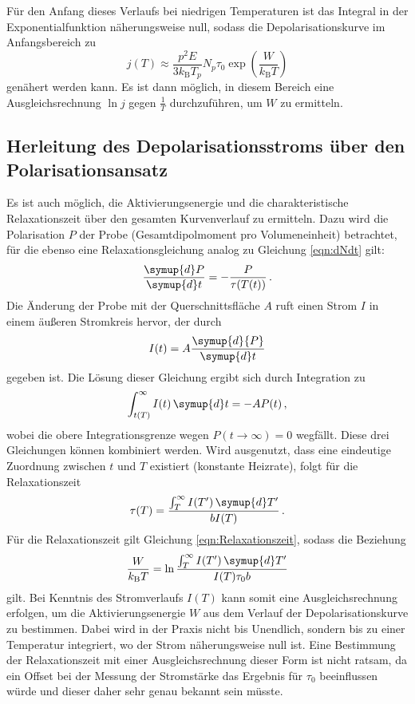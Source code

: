 Für den Anfang dieses Verlaufs bei niedrigen Temperaturen ist das Integral in der Exponentialfunktion näherungsweise null, sodass die Depolarisationskurve im Anfangsbereich zu
\begin{equation}
  j(T) \approx \frac{p^2 E}{3 k_\text{B} T_p} {N_p}{\tau_0}
               \exp\left(\frac{W}{k_{\text{B}}T}\right)
               \label{eqn:naeherung}
\end{equation}
genähert werden kann. Es ist dann möglich, in diesem Bereich eine Ausgleichsrechnung $\ln j$ gegen $\frac{1}{T}$ durchzuführen, um $W$ zu ermitteln.

\subsection{Herleitung des Depolarisationsstroms über den Polarisationsansatz}
\label{subsec:polAnsatz}

Es ist auch möglich, die Aktivierungsenergie und die charakteristische Relaxationszeit über den gesamten Kurvenverlauf zu ermitteln.
Dazu wird die Polarisation $P$ der Probe (Gesamtdipolmoment pro Volumeneinheit) betrachtet, für die ebenso eine Relaxationsgleichung analog zu Gleichung \eqref{eqn:dNdt} gilt:
\begin{equation}
  \frac{\symup{d}P}{\symup{d}t} = - \frac{P}{\tau(T(t))}\,.
\end{equation}
Die Änderung der Probe mit der Querschnittsfläche $A$ ruft einen Strom $I$ in einem äußeren Stromkreis hervor, der durch
\begin{equation}
  I(t) = A \frac{\symup{d}{P}}{\symup{d}t}
\end{equation}
gegeben ist. Die Lösung dieser Gleichung ergibt sich durch Integration zu
\begin{equation}
  \int_{t(T)}^{\infty} I(t) \, \symup{d}t = - A P(t)\,,
\end{equation}
wobei die obere Integrationsgrenze wegen $P(t\to\infty)=0$ wegfällt.
Diese drei Gleichungen können kombiniert werden. Wird ausgenutzt, dass eine eindeutige Zuordnung zwischen $t$ und $T$ existiert (konstante Heizrate), folgt für die Relaxationszeit
\begin{equation}
  \tau(T) = \frac{\int_T^{\infty} I(T') \, \symup{d}T'}{b I(T)}\,.
\end{equation}
Für die Relaxationszeit gilt Gleichung \eqref{eqn:Relaxationszeit}, sodass die Beziehung
\begin{equation}
  \frac{W}{k_\text{B}T} = \ln \frac{\int_T^\infty I(T')\,\symup{d}T'}{I(T) \tau_0 b}
  \label{eqn:polAnsatz}
\end{equation}
gilt. Bei Kenntnis des Stromverlaufs $I(T)$ kann somit eine Ausgleichsrechnung erfolgen, um die Aktivierungsenergie $W$ aus dem Verlauf der Depolarisationskurve zu bestimmen. Dabei wird in der Praxis nicht bis Unendlich, sondern bis zu einer Temperatur integriert, wo der Strom näherungsweise null ist.
Eine Bestimmung der Relaxationszeit mit einer Ausgleichsrechnung dieser Form ist nicht ratsam, da ein Offset bei der Messung der Stromstärke das Ergebnis für $\tau_0$ beeinflussen würde und dieser daher sehr genau bekannt sein müsste.

